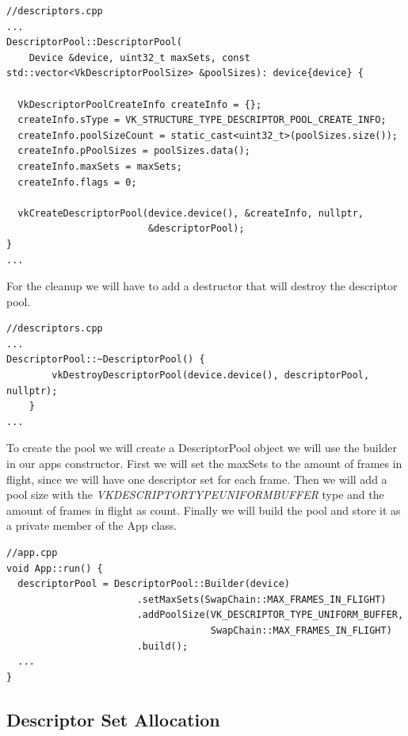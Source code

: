 \documentclass[12pt]{report} \usepackage{preamble}
\begin{document}
\begin{lstlisting}[Language=C++]
//descriptors.cpp
...
DescriptorPool::DescriptorPool(
    Device &device, uint32_t maxSets, const std::vector<VkDescriptorPoolSize> &poolSizes): device{device} {

  VkDescriptorPoolCreateInfo createInfo = {};
  createInfo.sType = VK_STRUCTURE_TYPE_DESCRIPTOR_POOL_CREATE_INFO;
  createInfo.poolSizeCount = static_cast<uint32_t>(poolSizes.size());
  createInfo.pPoolSizes = poolSizes.data();
  createInfo.maxSets = maxSets;
  createInfo.flags = 0;

  vkCreateDescriptorPool(device.device(), &createInfo, nullptr,
                         &descriptorPool);
}
...
\end{lstlisting}

For the cleanup we will have to add a destructor that will destroy the descriptor pool.

\begin{lstlisting}[Language=C++]
//descriptors.cpp
...
DescriptorPool::~DescriptorPool() {
		vkDestroyDescriptorPool(device.device(), descriptorPool, nullptr);
	}
...
\end{lstlisting}

To create the pool we will create a DescriptorPool object we will use the builder in our apps constructor.
First we will set the maxSets to the amount of frames in flight, since we will have one descriptor set for each frame.
Then we will add a pool size with the \textit{VK\textunderscore DESCRIPTOR\textunderscore TYPE\textunderscore UNIFORM\textunderscore BUFFER} type and the amount of frames in flight as count.
Finally we will build the pool and store it as a private member of the App class.

\begin{lstlisting}[Language=C++]
//app.cpp
void App::run() {
  descriptorPool = DescriptorPool::Builder(device)
                       .setMaxSets(SwapChain::MAX_FRAMES_IN_FLIGHT)
                       .addPoolSize(VK_DESCRIPTOR_TYPE_UNIFORM_BUFFER,
                                    SwapChain::MAX_FRAMES_IN_FLIGHT)
                       .build();
  ...
}
\end{lstlisting}

\subsection{Descriptor Set Allocation}
\end{document}
